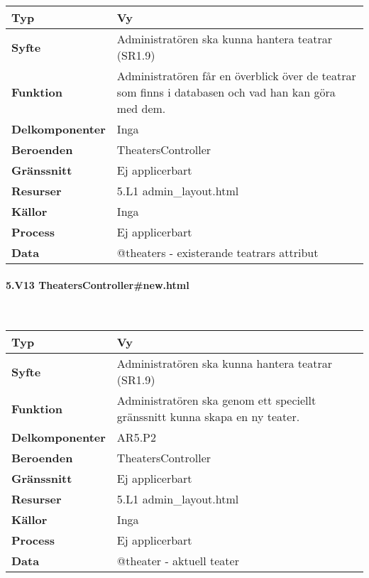 \documentclass[a4paper, twoside, 11pt, titlepage]{article}
\begin{document}
			\begin {table} [ht] \begin{tabular} {  p{3.5cm} p{11.6cm} }
				\hline
				{\sffamily\textbf{Typ}} & {Vy} \\
				\hline
				{\sffamily\textbf{Syfte}} & {Administratören ska kunna hantera teatrar (SR1.9)} \\
				\hline
				{\sffamily\textbf{Funktion}} & {Administratören får en överblick över de teatrar som finns i databasen och vad han kan göra med dem.} \\
				\hline
				{\sffamily\textbf{Delkomponenter}} & {Inga} \\
				\hline
				{\sffamily\textbf{Beroenden}} & {TheatersController} \\
				\hline
				{\sffamily\textbf{Gränssnitt}} & {Ej applicerbart} \\
				\hline
				{\sffamily\textbf{Resurser}} & {5.L1 admin\_layout.html} \\
				\hline
				{\sffamily\textbf{Källor}} & {Inga} \\
				\hline
				{\sffamily\textbf{Process}} & {Ej applicerbart} \\
				\hline
				{\sffamily\textbf{Data}} & {@theaters - existerande teatrars attribut} \\
				\hline
			\end{tabular} \end{table} \FloatBarrier


			\paragraph{5.V13 TheatersController\#new.html}\

			\begin {table} [ht] \begin{tabular} {  p{3.5cm} p{11.6cm} }
				\hline
				{\sffamily\textbf{Typ}} & {Vy} \\
				\hline
				{\sffamily\textbf{Syfte}} & {Administratören ska kunna hantera teatrar (SR1.9)} \\
				\hline
				{\sffamily\textbf{Funktion}} & {Administratören ska genom ett speciellt gränssnitt kunna skapa en ny teater.} \\
				\hline
				{\sffamily\textbf{Delkomponenter}} & {AR5.P2} \\
				\hline
				{\sffamily\textbf{Beroenden}} & {TheatersController} \\
				\hline
				{\sffamily\textbf{Gränssnitt}} & {Ej applicerbart} \\
				\hline
				{\sffamily\textbf{Resurser}} & {5.L1 admin\_layout.html} \\
				\hline
				{\sffamily\textbf{Källor}} & {Inga} \\
				\hline
				{\sffamily\textbf{Process}} & {Ej applicerbart} \\
				\hline
				{\sffamily\textbf{Data}} & {@theater - aktuell teater} \\
				\hline
			\end{tabular} \end{table} \FloatBarrier
\end{document}
